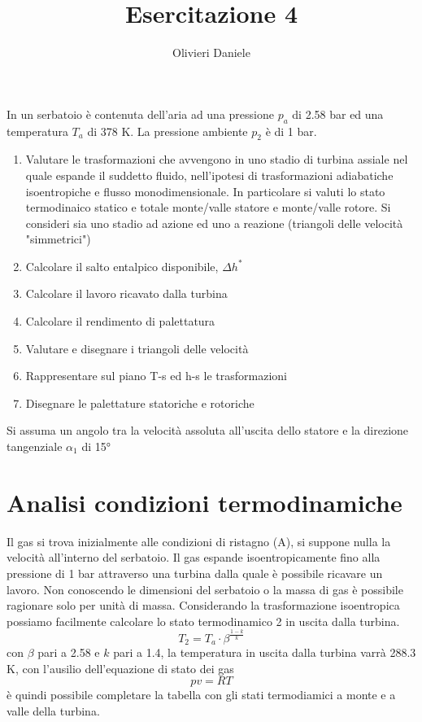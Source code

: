 \documentclass[a4paper,12pt]{article}
\title{Esercitazione 4}
\author{Olivieri Daniele}
\date{}
\begin{document}
\maketitle
In un serbatoio è contenuta dell'aria ad una pressione $p_a$ di 2.58 bar ed una temperatura $T_a$ di 378 K. La pressione ambiente $p_2$ è di 1 bar.
\begin{enumerate}
    \item Valutare le trasformazioni che avvengono in uno stadio di turbina assiale nel quale espande il suddetto fluido, nell'ipotesi
    di trasformazioni adiabatiche isoentropiche e flusso monodimensionale.
    In particolare si valuti lo stato termodinaico statico e totale monte/valle statore e monte/valle rotore. Si consideri sia uno stadio ad azione
    ed uno a reazione (triangoli delle velocità "simmetrici")    
    \item Calcolare il salto entalpico disponibile, $\Delta h^*$   
    \item Calcolare il lavoro ricavato dalla turbina
    \item Calcolare il rendimento di palettatura
    \item Valutare e disegnare i triangoli delle velocità
    \item Rappresentare sul piano T-s ed h-s le trasformazioni
    \item Disegnare le palettature statoriche e rotoriche
\end{enumerate}
Si assuma un angolo tra la velocità assoluta all'uscita dello statore e la direzione tangenziale $\alpha_1$ di 15°
\section{Analisi condizioni termodinamiche}
\label{sec:analisi_termodinamiche}
Il gas si trova inizialmente alle condizioni di ristagno (A), si suppone nulla la velocità all'interno del serbatoio.
Il gas espande isoentropicamente fino alla pressione di 1 bar attraverso una turbina dalla quale è possibile ricavare un lavoro.
Non conoscendo le dimensioni del serbatoio o la massa di gas è possibile ragionare solo per unità di massa.
Considerando la trasformazione isoentropica possiamo facilmente calcolare lo stato termodinamico 2 in uscita dalla turbina.
\begin{equation}
    \label{eq:isoentropica}
    T_2 = T_a\cdot\beta^{\frac{1-k}{k}}
\end{equation}
con $\beta$ pari a 2.58 e $k$ pari a 1.4, la temperatura in uscita dalla turbina varrà 288.3 K, con l'ausilio dell'equazione di stato dei gas
\begin{equation}
    \label{eq:stato_gas}
    pv = RT
\end{equation}
è quindi possibile completare la tabella con gli stati termodiamici a monte e a valle della turbina.
\end{document}
